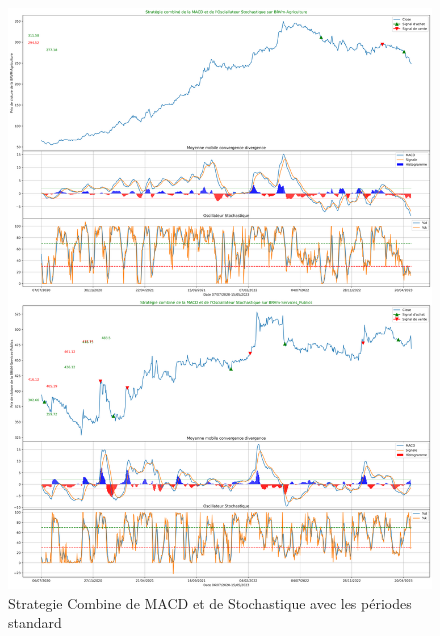 \begin{itemize}
  \begin{figure}
  \hypertarget{fig:Strategieux20Combineux20deux20MACDux20etux20deux20Stochastiqueux20avecux20lesux20puxe9riodesux20standard}{%
  \centering
  \includegraphics{img/MACD-standard.png}
  \caption{Strategie Combine de MACD et de Stochastique avec les
  périodes
  standard}\label{fig:Strategieux20Combineux20deux20MACDux20etux20deux20Stochastiqueux20avecux20lesux20puxe9riodesux20standard}
  }
  \end{figure}


\end{itemize}
